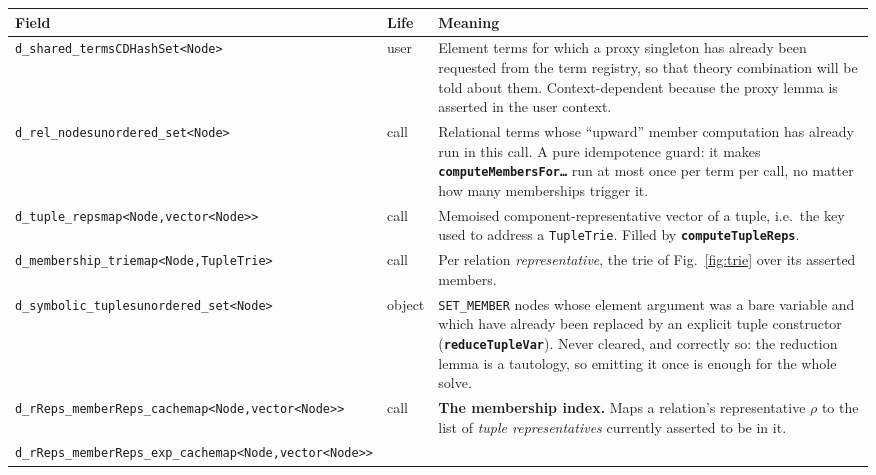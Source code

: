 \documentclass[11pt,a4paper]{article}
\newcommand{\code}[1]{\texttt{\small #1}}
\newcommand{\fn}[1]{\texttt{\small\bfseries #1}}
\theoremstyle{definition}
\begin{document}
\begin{center}\small
\renewcommand{\arraystretch}{1.22}
\begin{longtable}{@{}p{4.35cm}p{1.0cm}p{9.4cm}@{}}
\toprule
Field & Life & Meaning\\
\midrule\endhead
\code{d\_shared\_terms}\newline\scriptsize\code{CDHashSet<Node>} & user &
  Element terms for which a proxy singleton has already been requested from the
  term registry, so that theory combination will be told about them.
  Context-dependent because the proxy lemma is asserted in the user context.\\
\code{d\_rel\_nodes}\newline\scriptsize\code{unordered\_set<Node>} & call &
  Relational terms whose ``upward'' member computation has already run in this
  call. A pure idempotence guard: it makes
  \fn{computeMembersFor\dots} run at most once per term per call, no matter how
  many memberships trigger it.\\
\code{d\_tuple\_reps}\newline\scriptsize\code{map<Node,\allowbreak{}vector<Node>>} & call &
  Memoised component-representative vector of a tuple, i.e.\ the key used to
  address a \code{TupleTrie}. Filled by \fn{computeTupleReps}.\\
\code{d\_membership\_trie}\newline\scriptsize\code{map<Node,TupleTrie>} & call &
  Per relation \emph{representative}, the trie of Fig.~\ref{fig:trie} over its
  asserted members.\\
\code{d\_symbolic\_tuples}\newline\scriptsize\code{unordered\_set<Node>} &
  object &
  \code{SET\_MEMBER} nodes whose element argument was a bare variable and which
  have already been replaced by an explicit tuple constructor
  (\fn{reduceTupleVar}). Never cleared, and correctly so: the reduction lemma
  is a tautology, so emitting it once is enough for the whole solve.\\
\code{d\_rReps\_\allowbreak{}memberReps\_cache}\newline\scriptsize\code{map<Node,\allowbreak{}vector<Node>>}
  & call &
  \textbf{The membership index.} Maps a relation's representative $\rho$ to the
  list of \emph{tuple representatives} currently asserted to be in it.\\
\code{d\_rReps\_\allowbreak{}memberReps\_\allowbreak{}exp\_cache}\newline\scriptsize\code{map<Node,\allowbreak{}vector<Node>>}

\end{longtable}
\end{center}
\end{document}
